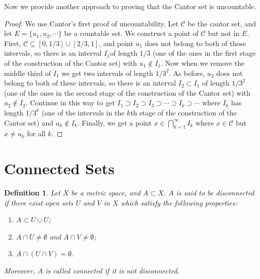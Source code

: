 \documentclass[11pt]{book}
\newtheorem{definition}{Definition}[chapter]
\theoremstyle{definition}
\numberwithin{equation}{chapter}
\begin{document}
\medskip

Now we provide another approach to proving that the Cantor set is uncountable.

\medskip

\begin{proof} We use Cantor's first proof of uncountability. Let $\mathcal{C}$ be the cantor set, and let $E = \{u_1,u_2,\cdots\}$ be a countable set. We construct a point of $\mathcal{C}$ but not in $E$. First, $\mathcal{C} \subseteq [0,1/3] \cup [2/3,1]$, and point $u_1$ does not belong to both of those intervals, so there is an interval $I_1$of length $1/3$ (one of the ones in the first stage of the construction of the Cantor set) with $u_1 \notin I_1$. Now when we remove the middle third of $I_1$ we get two intervals of length $1/3^2$. As before, $u_2$ does not belong to both of these intervals, so there is an interval $I_2 \subset I_1$ of length $1/3^2$ (one of the ones in the second stage of the construction of the Cantor set) with $u_2 \notin I_2$. Continue in this way to get $I_1 \supset I_2 \supset I_3 \supset \cdots \supset I_k \supset \cdots$ where $I_k$ has length $1/3^k$ (one of the intervals in the $k$th stage of the construction of the Cantor set) and $u_k \notin I_k$. Finally, we get a point $x \in \bigcap^\infty_{k=1} I_k$ where $x \in \mathcal{C}$ but $x \neq u_k$ for all $k$.
\end{proof}

\medskip



\section{Connected Sets}

\begin{definition}
Let $X$ be a metric space, and $A \subset X$. $A$ is said to be disconnected if there exist open sets $U$ and $V$ in $X$ which satisfy the following properties:
\begin{enumerate}[label=(\alph*)]
    \item $A \subset U \cup U$;
    
    \item $A \cap U \neq \emptyset$ and $A \cap V \neq \emptyset$;
    
    \item $A \cap (U \cap V) = \emptyset$.
\end{enumerate}
Moreover, $A$ is called connected if it is not disconnected.
\end{definition}
\end{document}
